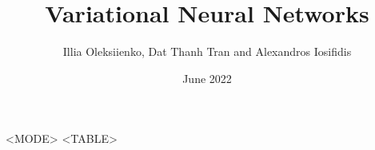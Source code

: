 \documentclass{article}
\title{Variational Neural Networks}
\author{Illia Oleksiienko, Dat Thanh Tran and Alexandros Iosifidis}
\date{June 2022}
\begin{document}
\maketitle

\begin{center}
    \begin{longtable}[c]{<MODE>}
    \endfirsthead
    \endhead
    \hline
    \endfoot
    \hline\hline
    \endlastfoot
    <TABLE>
    \end{longtable}
\end{center}
\end{document}
